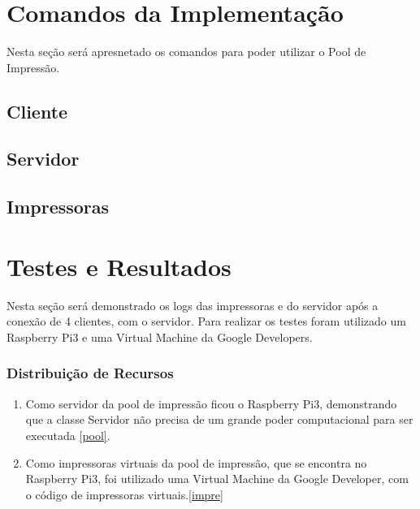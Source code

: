 \documentclass[12pt]{article}
\begin{document}
\section{Comandos da Implementação }
	Nesta seção será apresnetado os comandos para poder utilizar o Pool de Impressão. 
 
	\subsection{Cliente}
	
	\subsection{Servidor}
	
	\subsection{Impressoras}
 
 \section{Testes e Resultados }
 Nesta seção será demonstrado os logs das impressoras e do servidor após a conexão de 4 clientes, com o servidor.
 Para realizar os testes foram utilizado um Raspberry Pi3 e uma Virtual Machine da Google Developers.
 \subsubsection{Distribuição de Recursos}
 \begin{enumerate}
 	
 	\item Como servidor da pool de impressão ficou o Raspberry Pi3, demonstrando que a classe Servidor não precisa de um grande poder computacional para ser executada \ref{pool}.
 	\item Como impressoras virtuais da pool de impressão, que se encontra no Raspberry Pi3, foi utilizado uma Virtual Machine da Google Developer, com o código de impressoras virtuais.\ref{impre}
 \end{enumerate}
\end{document}
